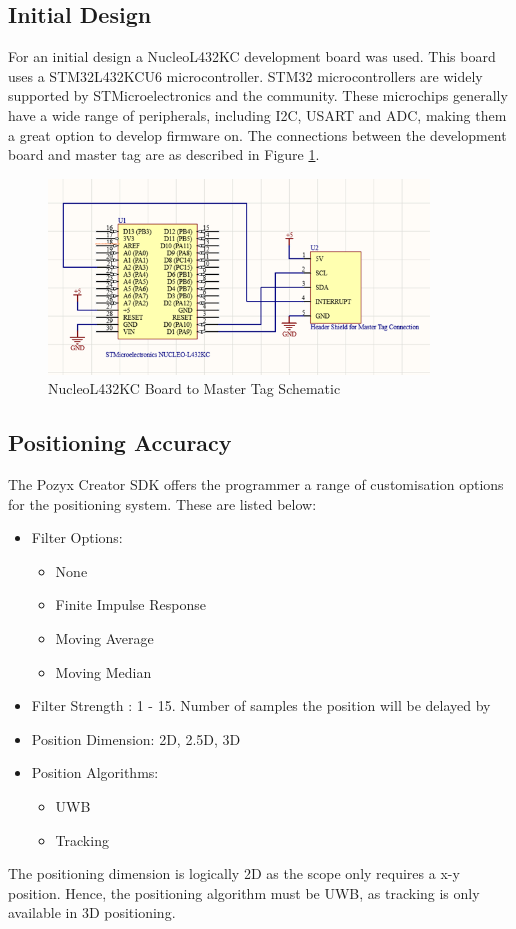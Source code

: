 \documentclass[12pt, a4paper]{article}
\begin{document}
\subsection{Initial Design}
For an initial design a NucleoL432KC development board was used. This board uses a STM32L432KCU6 microcontroller. 
STM32 microcontrollers are widely supported by STMicroelectronics and the community. These microchips generally have a wide range of 
peripherals, including I2C, USART and ADC, making them a great option to develop firmware on. The connections between the development board and 
master tag are as described in Figure \ref{fig:nuc_tag_cct}.
\begin{figure}[h]
    \centering
    \includegraphics[width=0.9\textwidth]{nucleo to tag.png}
    \caption{NucleoL432KC Board to Master Tag Schematic}
    \label{fig:nuc_tag_cct}
\end{figure}
\subsection{Positioning Accuracy}
The Pozyx Creator SDK offers the programmer a range of customisation options for the positioning system. These are listed below:
\begin{itemize}
    \item Filter Options:
    \begin{itemize}
        \item None 
        \item Finite Impulse Response
        \item Moving Average
        \item Moving Median
    \end{itemize}
    \item Filter Strength : 1 - 15. Number of samples the position will be delayed by
    \item Position Dimension: 2D, 2.5D, 3D 
    \item Position Algorithms:
    \begin{itemize}
        \item UWB
        \item Tracking
    \end{itemize}   
\end{itemize}
The positioning dimension is logically 2D as the scope only requires a x-y position. Hence, the positioning algorithm must be UWB, as 
tracking is only available in 3D positioning.
\end{document}
